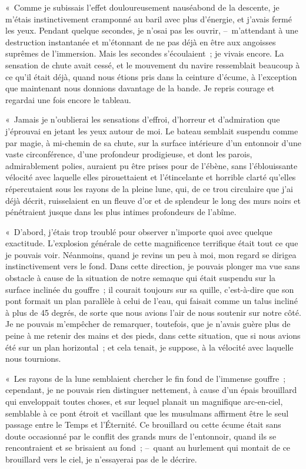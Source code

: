 \documentclass[french,twoside]{book} %
\begin{document}
« Comme je subissais l’effet douloureusement nauséabond de la descente, je m’étais instinctivement cramponné au baril avec plus d’énergie, et j’avais fermé les yeux. Pendant quelque secondes, je n’osai pas les ouvrir, – m’attendant à une destruction instantanée et m’étonnant de ne pas déjà en être aux angoisses suprêmes de l’immersion. Mais les secondes s’écoulaient ; je vivais encore. La sensation de chute avait cessé, et le mouvement du navire ressemblait beaucoup à ce qu’il était déjà, quand nous étions pris dans la ceinture d’écume, à l’exception que maintenant nous donnions davantage de la bande. Je repris courage et regardai une fois encore le tableau.\par
« Jamais je n’oublierai les sensations d’effroi, d’horreur et d’admiration que j’éprouvai en jetant les yeux autour de moi. Le bateau semblait suspendu comme par magie, à mi-chemin de sa chute, sur la surface intérieure d’un entonnoir d’une vaste circonférence, d’une profondeur prodigieuse, et dont les parois, admirablement polies, auraient pu être prises pour de l’ébène, sans l’éblouissante vélocité avec laquelle elles pirouettaient et l’étincelante et horrible clarté qu’elles répercutaient sous les rayons de la pleine lune, qui, de ce trou circulaire que j’ai déjà décrit, ruisselaient en un fleuve d’or et de splendeur le long des murs noirs et pénétraient jusque dans les plus intimes profondeurs de l’abîme.\par
« D’abord, j’étais trop troublé pour observer n’importe quoi avec quelque exactitude. L’explosion générale de cette magnificence terrifique était tout ce que je pouvais voir. Néanmoins, quand je revins un peu à moi, mon regard se dirigea instinctivement vers le fond. Dans cette direction, je pouvais plonger ma vue sans obstacle à cause de la situation de notre semaque qui était suspendu sur la surface inclinée du gouffre ; il courait toujours sur sa quille, c’est-à-dire que son pont formait un plan parallèle à celui de l’eau, qui faisait comme un talus incliné à plus de 45 degrés, de sorte que nous avions l’air de nous soutenir sur notre côté. Je ne pouvais m’empêcher de remarquer, toutefois, que je n’avais guère plus de peine à me retenir des mains et des pieds, dans cette situation, que si nous avions été sur un plan horizontal ; et cela tenait, je suppose, à la vélocité avec laquelle nous tournions.\par
« Les rayons de la lune semblaient chercher le fin fond de l’immense gouffre ; cependant, je ne pouvais rien distinguer nettement, à cause d’un épais brouillard qui enveloppait toutes choses, et sur lequel planait un magnifique arc-en-ciel, semblable à ce pont étroit et vacillant que les musulmans affirment être le seul passage entre le Temps et l’Éternité. Ce brouillard ou cette écume était sans doute occasionné par le conflit des grands murs de l’entonnoir, quand ils se rencontraient et se brisaient au fond ; – quant au hurlement qui montait de ce brouillard vers le ciel, je n’essayerai pas de le décrire.\par
\end{document}
